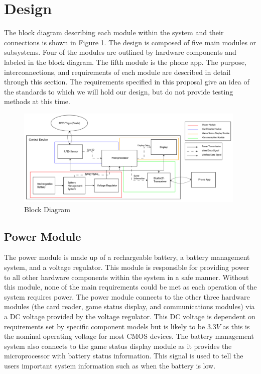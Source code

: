 \documentclass[12pt]{article}
\begin{document}
\section{Design}

The block diagram describing each module within the system and their connections is shown in Figure \ref{fig:block}. The design is composed of five main modules or subsystems. Four of the modules are outlined by hardware components and labeled in the block diagram. The fifth module is the phone app. The purpose, interconnections, and requirements of each module are described in detail through this section. The requirements specified in this proposal give an idea of the standards to which we will hold our design, but do not provide testing methods at this time.

\begin{figure}[h!]
	\centering
	\includegraphics[width=0.98\textwidth]{Full_Block_Diagram_v3.png}
	\caption{Block Diagram}
	\label{fig:block}
\end{figure}

\subsection{Power Module}

The power module is made up of a rechargeable battery, a battery management system, and a voltage regulator. This module is responsible for providing power to all other hardware components within the system in a safe manner. Without this module, none of the main requirements could be met as each operation of the system requires power. The power module connects to the other three hardware modules (the card reader, game status display, and communications modules) via a DC voltage provided by the voltage regulator. This DC voltage is dependent on requirements set by specific component models but is likely to be $3.3V$ as this is the nominal operating voltage for most CMOS devices. The battery management system also connects to the game status display module as it provides the microprocessor with battery status information. This signal is used to tell the users important system information such as when the battery is low.
\end{document}
